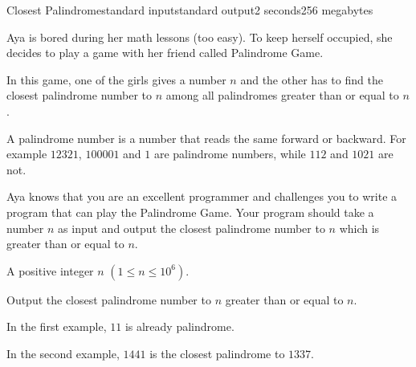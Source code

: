 \begin{problem}{Closest Palindrome}{standard input}{standard output}{2 seconds}{256 megabytes}

Aya is bored during her math lessons (too easy). To keep herself occupied, she decides to play a game with her friend called Palindrome Game.

In this game, one of the girls gives a number $n$ and the other has to find the closest palindrome number to $n$ among all palindromes greater than or equal to $n$.

A palindrome number is a number that reads the same forward or backward. For example $12321$, $100001$ and $1$ are palindrome numbers, while $112$ and $1021$ are not.

Aya knows that you are an excellent programmer and challenges you to write a program that can play the Palindrome Game. Your program should take a number $n$ as input and output the closest palindrome number to $n$ which is greater than or equal to $n$.

\InputFile
A positive integer $n$ $(1 \leq n \leq 10^6)$.

\OutputFile
Output the closest palindrome number to $n$ greater than or equal to $n$. 

\Examples

\begin{example}
%
%
\end{example}

\Note
In the first example, $11$ is already palindrome.

In the second example, $1441$ is the closest palindrome to $1337$.

\end{problem}

